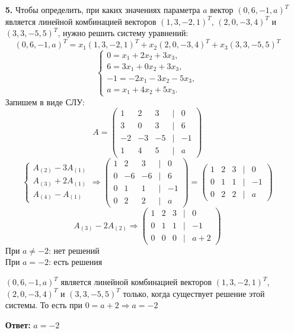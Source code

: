 \documentclass[a4paper]{article}
\newcommand{\mat}[1]{\begin{pmatrix} #1 \end{pmatrix}}
\newcommand{\case}[1]{\begin{cases} #1 \end{cases}}
\renewcommand{\r}{\Rightarrow}
\begin{document}
\begin{enumerate}
    \item[\textbf{5.}] Чтобы определить, при каких значениях параметра \( a \) вектор \((0, 6, -1, a)^T\) является линейной комбинацией векторов \((1, 3, -2, 1)^T\), \((2, 0, -3, 4)^T\) и \((3, 3, -5, 5)^T\), нужно решить систему уравнений:
    \[
    (0, 6, -1, a)^T = x_1(1, 3, -2, 1)^T + x_2(2, 0, -3, 4)^T + x_3(3, 3, -5, 5)^T
    \]
    \[
    \case{
    0 = x_1 + 2x_2 + 3x_3, \\
    6 = 3x_1 + 0x_2 + 3x_3, \\
    -1 = -2x_1 - 3x_2 - 5x_3, \\
    a = x_1 + 4x_2 + 5x_3.
    }
    \]
    Запишем в виде СЛУ:
    \[A = 
    \mat{
    1 & 2 & 3 & | & 0 \\
    3 & 0 & 3 & | & 6 \\
    -2 & -3 & -5 & | & -1 \\
    1 & 4 & 5 & | & a
    }
    \]
    $$\case{
        A_{(2)} - 3A_{(1)}\\
        A_{(3)} + 2A_{(1)}\\
        A_{(4)} - A_{(1)}
    }\r \mat{
        1 & 2 & 3 & | & 0 \\
        0 & -6 & -6 & | & 6 \\
        0 & 1 & 1 & | & -1 \\
        0 & 2 & 2 & | & a
        } = \mat{
            1 & 2 & 3 & | & 0 \\
            0 & 1 & 1 & | & -1 \\
            0 & 2 & 2 & | & a
            }$$
    $$A_{(3)} - 2A_{(2)} \r \mat{
        1 & 2 & 3 & | & 0 \\
        0 & 1 & 1 & | & -1 \\
        0 & 0 & 0 & | & a+2
        }$$
    При $a \neq -2$: нет решений \\
    При $a = -2$: есть решения 

    \((0, 6, -1, a)^T\) является линейной комбинацией векторов \((1, 3, -2, 1)^T\), \((2, 0, -3, 4)^T\) и \((3, 3, -5, 5)^T\) только, когда существует решение этой системы.
    То есть при $0 =a+2 \r a = -2$

    \textbf{Ответ:} $a = -2$
\end{enumerate}
\end{document}
